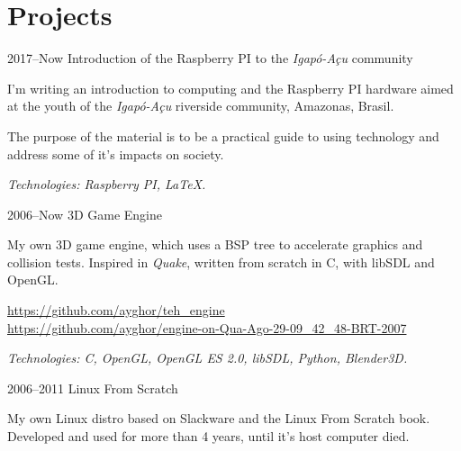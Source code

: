 \documentclass[a4paper]{simplecv}
\begin{document}
\section{Projects}

\begin{topic}
%
%
%

\item[2017--Now] Introduction of the Raspberry PI to the \emph{Igapó-Açu} community

	I'm writing an introduction to computing and the Raspberry PI hardware
	aimed at the youth of the \emph{Igapó-Açu} riverside community,
	Amazonas, Brasil.

	The purpose of the material is to be a practical guide to using
	technology and address some of it's impacts on society.

	{\em\scriptsize Technologies: Raspberry PI, \LaTeX{}.}

\item[2006--Now] 3D Game Engine

	My own 3D game engine, which uses a BSP tree to accelerate graphics and
	collision tests. Inspired in \emph{Quake}, written from scratch in C,
	with libSDL and OpenGL.

	{\scriptsize\url{https://github.com/ayghor/teh_engine}}\\
	{\scriptsize\url{https://github.com/ayghor/engine-on-Qua-Ago-29-09\_42\_48-BRT-2007}}

	{\em\scriptsize Technologies: C, OpenGL, OpenGL ES 2.0, libSDL, Python,
	Blender3D.}

%
%

\item[2006--2011] Linux From Scratch

	My own Linux distro based on Slackware and the Linux From Scratch book.
	Developed and used for more than 4 years, until it's host computer
	died.


\end{topic}
\end{document}
